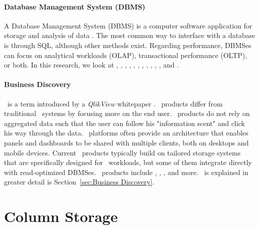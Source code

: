 \paragraph{Database Management System (DBMS)}
\label{par:Database Management System (DBMS)}
A Database Management System (DBMS) is a computer software application for storage and analysis of data \cite{Wikipedia_contributors2015-pb}. The most common way to interface with a database is through SQL, although other methods exist. Regarding performance, DBMSes can focus on analytical workloads (OLAP), transactional performance (OLTP), or both. In this research, we look at \oracle, \ibm, \saph, \sapnw, \mssql, \cstore, \vertica, \blink, \exasol, \oracle, \hyper, and \hyrise.

\paragraph{Business Discovery}
\label{par:Business Discovery}
\bd~is a term introduced by a \textit{QlikView} whitepaper \cite{Qlik2014-vd}. \bd~products differ from traditional \bi~systems by focusing more on the end user. \bd~products do not rely on aggregated data such that the user can follow his "information scent" and click his way through the data. \bd~platforms often provide an architecture that enables panels and dashboards to be shared with multiple clients, both on desktops and mobile devices. Current \bd~products typically build on tailored storage systems that are specifically designed for \bd~workloads, but some of them integrate directly with read-optimized DBMSes. \bd~products include \tableau, \qlikview, \powerpivot, and more. \bd~is explained in greater detail is Section~\ref{sec:Business Discovery}. 


\section{Column Storage}
\label{sec:Column Storage}

